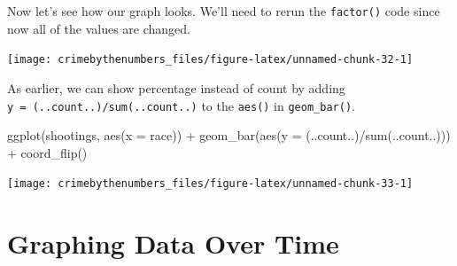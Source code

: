 \documentclass[
]{krantz}
\makeatletter
\newenvironment{Shaded}{\begin{snugshade}}{\end{snugshade}}
\newcommand{\AttributeTok}[1]{\textcolor[rgb]{0.61,0.61,0.61}{#1}}
\newcommand{\ConstantTok}[1]{\textcolor[rgb]{0,0,0}{#1}}
\newcommand{\FunctionTok}[1]{\textcolor[rgb]{0,0,0}{#1}}
\newcommand{\NormalTok}[1]{#1}
\newcommand{\OtherTok}[1]{\textcolor[rgb]{0.37,0.37,0.37}{#1}}
\newcommand{\SpecialCharTok}[1]{\textcolor[rgb]{0,0,0}{#1}}
\newenvironment{kframe}{%
\medskip{}
\setlength{\fboxsep}{.8em}
 \def\at@end@of@kframe{}%
 \ifinner\ifhmode%
  \def\at@end@of@kframe{\end{minipage}}%
  \begin{minipage}{\columnwidth}%
 \fi\fi%
 \def\FrameCommand##1{\hskip\@totalleftmargin \hskip-\fboxsep
 \colorbox{shadecolor}{##1}\hskip-\fboxsep
     \hskip-\linewidth \hskip-\@totalleftmargin \hskip\columnwidth}%
 \MakeFramed {\advance\hsize-\width
   \@totalleftmargin\z@ \linewidth\hsize
   \@setminipage}}%
 {\par\unskip\endMakeFramed%
 \at@end@of@kframe}
\renewenvironment{Shaded}{\begin{kframe}}{\end{kframe}}
\makeatother
\begin{document}
Now let's see how our graph looks. We'll need to rerun the \texttt{factor()} code since now all of the values are changed.

\begin{Shaded}
\end{Shaded}

\begin{center}\texttt{[image: crimebythenumbers\_files/figure-latex/unnamed-chunk-32-1]} \end{center}

As earlier, we can show percentage instead of count by adding \texttt{y\ =\ (..count..)/sum(..count..)} to the \texttt{aes()} in \texttt{geom\_bar()}.

\begin{Shaded}
\begin{Highlighting}[]
\FunctionTok{ggplot}\NormalTok{(shootings, }\FunctionTok{aes}\NormalTok{(}\AttributeTok{x =}\NormalTok{ race)) }\SpecialCharTok{+} 
  \FunctionTok{geom\_bar}\NormalTok{(}\FunctionTok{aes}\NormalTok{(}\AttributeTok{y =}\NormalTok{ (..count..)}\SpecialCharTok{/}\FunctionTok{sum}\NormalTok{(..count..))) }\SpecialCharTok{+}
  \FunctionTok{coord\_flip}\NormalTok{() }
\end{Highlighting}
\end{Shaded}

\begin{center}\texttt{[image: crimebythenumbers\_files/figure-latex/unnamed-chunk-33-1]} \end{center}

\hypertarget{graphing-data-over-time}{%
\section{Graphing Data Over Time}\label{graphing-data-over-time}}
\end{document}
